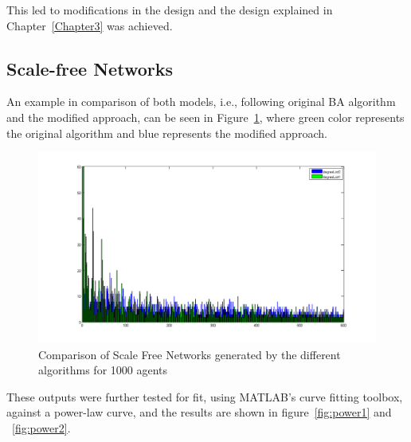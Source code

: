 This led to modifications in the design and the design explained in Chapter~\ref{Chapter3} was achieved.


\subsection{Scale-free Networks}

An example in comparison of both models, i.e., following original BA algorithm and the modified approach, can be seen in Figure~\ref{fig:scaleFree_comp}, where green color represents the original algorithm and blue represents the modified approach.

\begin{figure}
\centering
\includegraphics[scale=0.5]{Figures/scaleFree_comparison}
\caption[Comparison of Scale Free Networks]{Comparison of Scale Free Networks generated by the different algorithms for 1000 agents}
\label{fig:scaleFree_comp}
\end{figure}

These outputs were further tested for fit, using MATLAB's curve fitting toolbox, against a power-law curve, and the results are shown in figure~\ref{fig:power1} and ~\ref{fig:power2}.

